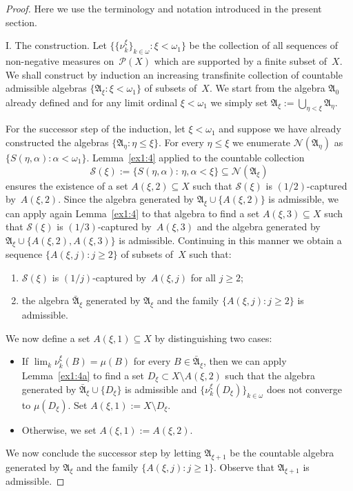\documentclass[12pt]{amsart}
\newcommand{\sm}{\setminus}
\newcommand{\sub}{\subseteq}
\newcommand{\alg}{\mathfrak A}
\newcommand{\NN}{{\mathcal N}}
\newcommand{\PP}{{\mathcal P}}
\newcommand{\0}{\protect{\bf 0}}
\newcommand{\1}{\protect{\bf 1}}
\theoremstyle{definition}
\theoremstyle{remark}
\numberwithin{equation}{section}
\begin{document}
\begin{proof} 
Here we use the terminology and notation introduced in the present section. 

\smallskip
{\sc I. The construction.} 
Let $\{\{\nu^\xi_k\}_{k\in \omega}:\xi<\omega_1\}$
be the collection of all sequences of non-negative measures on~$\PP(X)$ 
which are supported by a finite subset of~$X$.
We shall construct by induction an increasing transfinite collection of countable admissible
algebras $\{\alg_\xi: \xi < \omega_1\}$
of subsets of~$X$. We start from the algebra $\alg_0$ already defined and for any limit ordinal $\xi<\omega_1$ we simply 
set $\alg_\xi:=\bigcup_{\eta<\xi}\alg_\eta$. 

For the successor step of the induction, let $\xi < \omega_1$ and suppose we have already constructed 
the algebras $\{\alg_\eta:\eta \leq \xi\}$. For every $\eta \leq \xi$ we enumerate 
$\NN(\alg_\eta)$ as $\{S(\eta,\alpha):\alpha<\omega_1\}$. 
Lemma~\ref{ex1:4} applied to the countable collection
$$
	\mathcal{S}(\xi):=\{S(\eta,\alpha):\, \eta, \alpha<\xi\} \sub \NN(\alg_\xi)
$$
ensures the existence of a set $A(\xi,2) \sub X$
such that $\mathcal{S}(\xi)$ is $(1/2)$-captured by~$A(\xi,2)$.
Since the algebra generated by $\alg_\xi\cup \{A(\xi,2)\}$ is admissible, we 
can apply again Lemma~\ref{ex1:4} to that algebra to find a set $A(\xi,3) \sub X$
such that $\mathcal{S}(\xi)$ is $(1/3)$-captured by~$A(\xi,3)$
and the algebra generated by $\alg_\xi\cup \{A(\xi,2),A(\xi,3)\}$
is admissible. Continuing in this manner we obtain a sequence 
$\{A(\xi,j):j \geq 2\}$ of subsets of~$X$
such that: 
\begin{enumerate}
\item[(a)] $\mathcal{S}(\xi)$ is $(1/j)$-captured by~$A(\xi,j)$
for all $j\geq 2$;
\item[(b)] the algebra $\bar{\alg}_\xi$ generated by $\alg_\xi$
and the family $\{A(\xi,j):j\ge 2\}$ is admissible. 
\end{enumerate}
We now define a set $A(\xi,1)\sub X$ by distinguishing two cases:
\begin{itemize}
\item If $\lim_k \nu^\xi_k(B)=\mu(B)$ for every $B\in \bar{\alg}_\xi$, 
then we can apply Lemma~\ref{ex1:4a} to find 
a set $D_\xi\subset X\sm A(\xi,2)$ such that the algebra generated by
$\bar{\alg}_\xi\cup \{D_\xi\}$ is admissible and $\{\nu^\xi_k(D_\xi)\}_{k\in \omega}$ does not converge to $\mu(D_\xi)$.
Set $A(\xi,1):=X\sm D_\xi$. 
\item Otherwise, we set $A(\xi,1):=A(\xi,2)$.
\end{itemize}
We now conclude the successor step by letting $\alg_{\xi+1}$ 
be the countable algebra generated by $\alg_\xi$ and the family $\{A(\xi,j):j\ge 1\}$.
Observe that $\alg_{\xi+1}$ is admissible.


\end{proof}
\end{document}
